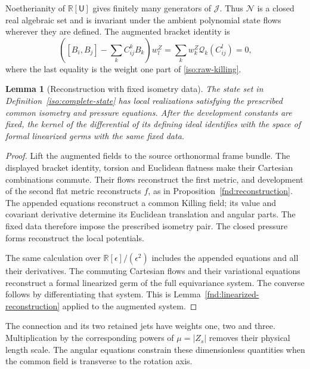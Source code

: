 \documentclass[11pt,a4paper]{article}
\numberwithin{equation}{section}
\theoremstyle{plain}
\newtheorem{lemma}[theorem]{Lemma}
\theoremstyle{definition}
\theoremstyle{remark}
\begin{document}
Noetherianity of $\mathbb R[\mathsf U]$ gives finitely many generators of $\mathscr J$.
Thus $\mathscr N$ is a closed real algebraic set and is invariant under the
ambient polynomial state flows wherever they are defined.
The augmented bracket identity is
\begin{equation}\label{iso:augmented-bracket}
 \left([B_i,B_j]-\sum_kC^k_{ij}B_k\right)w_l^Z
      =\sum_k w_k^Z\mathcal Q_k(C^l_{ij})=0,
\end{equation}
where the last equality is the weight one part of
\eqref{iso:raw-killing}.

\begin{lemma}[Reconstruction with fixed isometry data]
\label{iso:augmented-reconstruction}
The state set in Definition~\ref{iso:complete-state} has local
realizations satisfying the prescribed common isometry and pressure
equations. After the development constants are fixed, the kernel
of the differential of its defining ideal identifies with the space of
formal linearized germs with the same fixed data.
\end{lemma}
\begin{proof}
Lift the augmented fields to the source orthonormal frame bundle.
The displayed bracket identity, torsion and Euclidean flatness make
their Cartesian combinations commute. Their flows reconstruct the
first metric, and development of the second flat metric reconstructs
$f$, as in Proposition~\ref{fnd:reconstruction}. The appended equations
reconstruct a common Killing field; its value and covariant derivative
determine its Euclidean translation and angular parts. The fixed
data therefore impose the prescribed isometry pair.
The closed pressure forms reconstruct the local potentials.

The same calculation over $\mathbb R[\epsilon]/(\epsilon^2)$
includes the appended equations and all their derivatives.
The commuting Cartesian flows and their variational equations
reconstruct a formal linearized germ of the full equivariance system.
The converse follows by differentiating that system.
This is Lemma~\ref{fnd:linearized-reconstruction} applied to the augmented system.
\end{proof}

The connection and its two retained jets have weights one, two and
three. Multiplication by the corresponding powers of $\mu=|Z_s|$
removes their physical length scale. The angular equations constrain
these dimensionless quantities when the common field is transverse
to the rotation axis.
\end{document}
